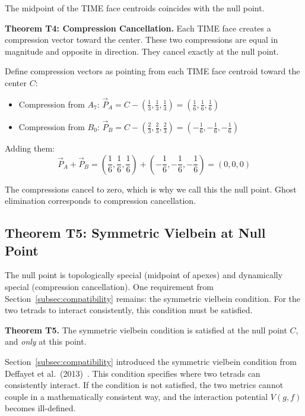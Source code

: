 \documentclass[aps,prd,preprint,superscriptaddress,showpacs,preprintnumbers,amsmath,amssymb,nofootinbib]{revtex4-2}
\begin{document}
The midpoint of the TIME face centroids coincides with the null point.

\textbf{Theorem T4: Compression Cancellation.} Each TIME face creates a compression vector toward the center. These two compressions are equal in magnitude and opposite in direction. They cancel exactly at the null point.

Define compression vectors as pointing from each TIME face centroid toward the center $C$:
\begin{itemize}
\item Compression from $A_7$: $\vec{P}_A = C - (\frac{1}{3}, \frac{1}{3}, \frac{1}{3}) = (\frac{1}{6}, \frac{1}{6}, \frac{1}{6})$
\item Compression from $B_0$: $\vec{P}_B = C - (\frac{2}{3}, \frac{2}{3}, \frac{2}{3}) = (-\frac{1}{6}, -\frac{1}{6}, -\frac{1}{6})$
\end{itemize}

Adding them:
\begin{equation}
\vec{P}_A + \vec{P}_B = (\frac{1}{6}, \frac{1}{6}, \frac{1}{6}) + (-\frac{1}{6}, -\frac{1}{6}, -\frac{1}{6}) = (0, 0, 0)
\end{equation}

The compressions cancel to zero, which is why we call this the null point. Ghost elimination corresponds to compression cancellation.

\subsection{Theorem T5: Symmetric Vielbein at Null Point}
\label{subsec:theorem-t5}

The null point is topologically special (midpoint of apexes) and dynamically special (compression cancellation). One requirement from Section~\ref{subsec:compatibility} remains: the symmetric vielbein condition. For the two tetrads to interact consistently, this condition must be satisfied.

\textbf{Theorem T5.} The symmetric vielbein condition is satisfied at the null point $C$, and \emph{only} at this point.

Section~\ref{subsec:compatibility} introduced the symmetric vielbein condition from Deffayet et al.\ (2013)~\cite{deffayet2013}. This condition specifies where two tetrads can consistently interact. If the condition is not satisfied, the two metrics cannot couple in a mathematically consistent way, and the interaction potential $V(g,f)$ becomes ill-defined.
\end{document}
